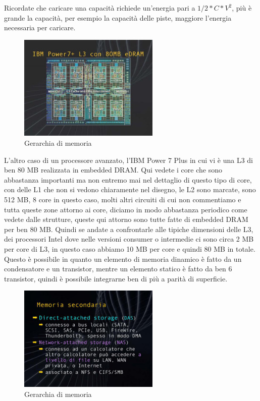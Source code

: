 Ricordate che caricare una capacità richiede un'energia pari a $1/2*C*V^2$, più è grande la capacità, per esempio la capacità delle piste, maggiore l'energia necessaria per caricare.

\FloatBarrier
\begin{figure}[H]
  \centering
  \includegraphics[width=0.60\textwidth,
                    trim=20 20 10 20, %
                    clip]
                    {images/Lez06_p02_fig_03.png}
  \caption{Gerarchia di memoria}
  \label{fig:Lez06_p02_fig_03}
\end{figure}
\FloatBarrier
\noindent

L'altro caso di un processore avanzato, l'IBM Power 7 Plus in cui vi è una L3 di ben 80 MB realizzata in embedded DRAM.
Qui vedete i core che sono abbastanza importanti ma non entremo mai nel dettaglio di questo tipo di core, con delle L1 che non si vedono chiaramente nel disegno, le L2 sono marcate, sono 512 MB, 8 core in questo caso, molti altri circuiti di cui non commentiamo e tutta queste zone attorno ai core, diciamo in modo abbastanza periodico come vedete dalle strutture, queste qui attorno sono tutte fatte di embedded DRAM per ben 80 MB.
Quindi se andate a confrontarle alle tipiche dimensioni delle L3, dei processori Intel dove nelle versioni consumer o intermedie ci sono circa 2 MB per core di L3, in questo caso abbiamo 10 MB per core e quindi 80 MB in totale.
Questo è possibile in quanto un elemento di memoria dinamico è fatto da un condensatore e un transistor, mentre un elemento statico è fatto da ben 6 transistor, quindi è possibile integrarne ben di più a parità di superficie.

\FloatBarrier
\begin{figure}[H]
  \centering
  \includegraphics[width=0.60\textwidth,
                    trim=20 20 10 20, %
                    clip]
                    {images/Lez06_p02_fig_04.png}
  \caption{Gerarchia di memoria}
  \label{fig:Lez06_p02_fig_04}
\end{figure}
\FloatBarrier
\noindent

